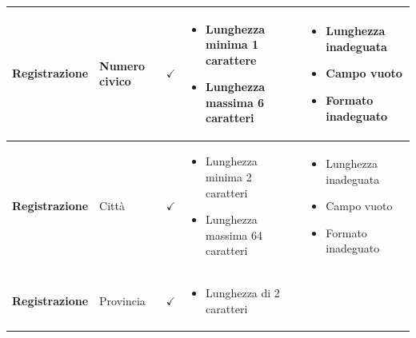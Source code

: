 \documentclass[12pt]{article}
\begin{document}
\begin{longtable}{|l|l|l|l|l|}
 \textbf{Registrazione} & Numero civico & $\checkmark$ & \begin{minipage}{3.5cm}
 \vspace{5pt}
 \begin{itemize}
 \item Lunghezza minima 1 carattere
 \item Lunghezza massima 6 caratteri
 
 \end{itemize}
 \vspace{5pt}
 \end{minipage} & \begin{minipage}{4cm}
 \vspace{5pt}
 \begin{itemize}
 \item Lunghezza inadeguata
 \item Campo vuoto
 \item Formato inadeguato
 \end{itemize}
 \vspace{5pt}
 \end{minipage} \\ \hline
 
\textbf{Registrazione} & Città & $\checkmark$ & \begin{minipage}{3.5cm}
 \vspace{5pt}
 \begin{itemize}
 \item Lunghezza minima 2 caratteri
 \item Lunghezza massima 64 caratteri
 
 \end{itemize}
 \vspace{5pt}
 \end{minipage} & \begin{minipage}{4cm}
 \vspace{5pt}
 \begin{itemize}
 \item Lunghezza inadeguata
 \item Campo vuoto
 \item Formato inadeguato
 \end{itemize}
 \vspace{5pt}
 \end{minipage} \\ \hline
 
\textbf{Registrazione} & Provincia & $\checkmark$ & \begin{minipage}{3.5cm}
 \vspace{5pt}
 \begin{itemize}
 \item Lunghezza di 2 caratteri
 

\end{itemize}
\end{minipage}
\end{longtable}
\end{document}
